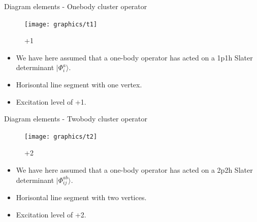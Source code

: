 \begin{frame}{Diagram elements - Onebody cluster operator}
    \renewcommand{\figurename}{Level}

    \begin{figure}
    \centering
    \parbox{0.20\textwidth}{
            \centering
            \texttt{[image: graphics/t1]}
            \caption{+1}
        }
    \end{figure}

    \begin{itemize}
\item We have here assumed that a one-body operator has acted on a 1p1h Slater determinant $|\Phi_i^a\rangle$.
        \item Horisontal line segment with one vertex.
        \item Excitation level of +1.
    \end{itemize}
\end{frame}




\begin{frame}{Diagram elements - Twobody cluster operator}

    \renewcommand{\figurename}{Level}

    \begin{figure}
    \centering
    \parbox{0.20\textwidth}{
            \centering
            \texttt{[image: graphics/t2]}
            \caption{+2}
        }
    \end{figure}

    \begin{itemize}
\item We have here assumed that a one-body operator has acted on a 2p2h Slater determinant $|\Phi_{ij}^{ab}\rangle$.
        \item Horisontal line segment with two vertices.
        \item Excitation level of +2.
    \end{itemize}
\end{frame}

